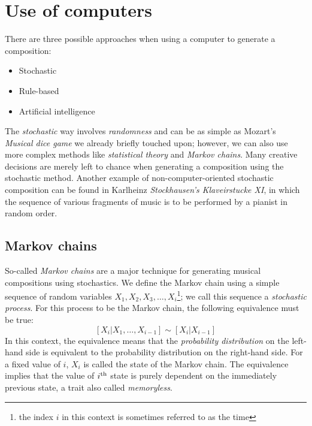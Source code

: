\section{Use of computers}\label{sec:use-of-computer}

There are three possible approaches when using a computer to generate a composition:
\begin{itemize}
    \item Stochastic
    \item Rule-based
    \item Artificial intelligence
\end{itemize}

The \textit{stochastic} way involves \textit{randomness} and can be as simple as Mozart's \textit{Musical dice game} we already briefly touched upon;
however, we can also use more complex methods like \textit{statistical theory} and \textit{Markov chains}.
Many creative decisions are merely left to chance when generating a composition using the stochastic method.
Another example of non-computer-oriented stochastic composition can be found in Karlheinz \textit{Stockhausen's Klaveirstucke XI}, in which the sequence of various fragments of music is to be performed by a pianist in random order.~\cite{brief-history-of-algo-composition}

\subsection{Markov chains}\label{subsec:markov-chains}

So-called \textit{Markov chains} are a major technique for generating musical compositions using stochastics.
We define the Markov chain using a simple sequence of random variables $X_1, X_2, X_3, \ldots, X_i$\footnote{the index $i$ in this context is sometimes referred to as the time}; we call this sequence a \textit{stochastic process}.
For this process to be the Markov chain, the following equivalence must be true:
\[ [X_i\rvert X_1, \ldots, X_{i-1}] \sim [X_i\rvert X_{i-1}] \]
In this context, the equivalence means that the \textit{probability distribution} on the left-hand side is equivalent to the probability distribution on the right-hand side.
For a fixed value of $i$, $X_i$ is called the state of the Markov chain.
The equivalence implies that the value of $i\textsuperscript{th}$ state is purely dependent on the immediately previous state, a trait also called \textit{memoryless}.~\cite{markov-chains}


